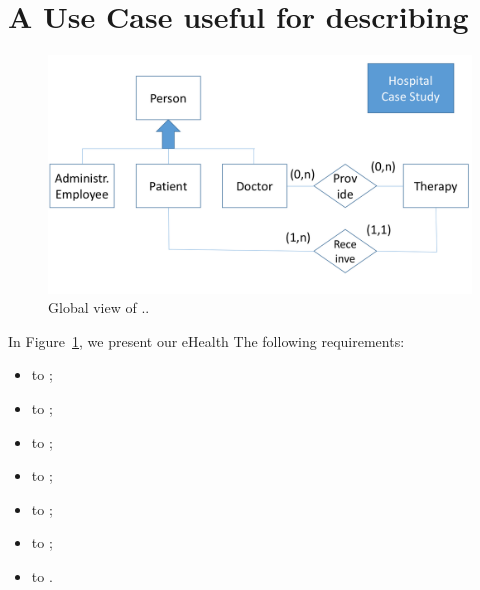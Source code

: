 \section{A Use Case useful for describing }
\label{sec:UCs}
\begin{figure}[hbt]
	\centering
	\includegraphics[scale=0.27]{figure/E-R-in-Hospital}
	\caption{Global view of ..}
	\label{fig:cdesign}
	
\end{figure}




\par
In Figure~\ref{fig:cdesign}, we present our eHealth The following requirements:
\begin{itemize}
	\item to  ;
	\item to  ;
	\item to  ;
	\item to  ;
	\item to  ;
	\item to  ;
	\item to  .
\end{itemize}


